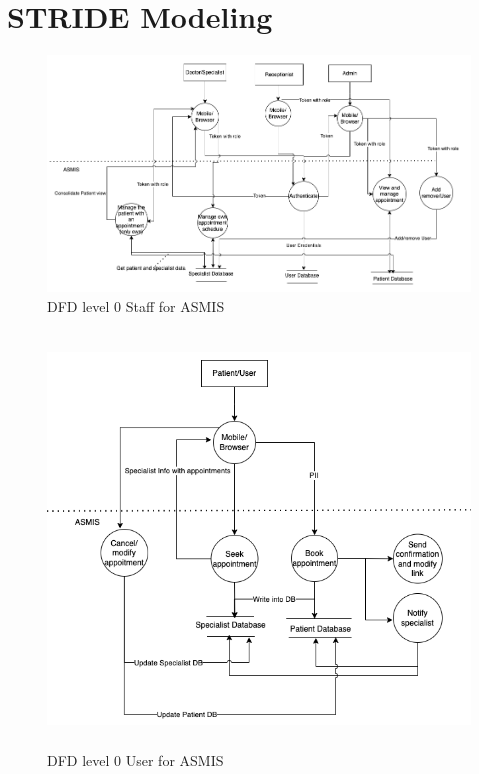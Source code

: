 \section{STRIDE Modeling}

\begin{figure}[h!]
\centering
\includegraphics[width=\textwidth]{pics/dfd_staff.png}
\caption{DFD level 0 Staff for ASMIS}\label{fig:dfd_staff}
\end{figure}

\begin{figure}[h!]
\centering
\includegraphics[width=12cm, height=11cm]{pics/dfd_user.png}
\caption{DFD level 0 User for ASMIS}\label{fig:dfd_user}
\end{figure}

